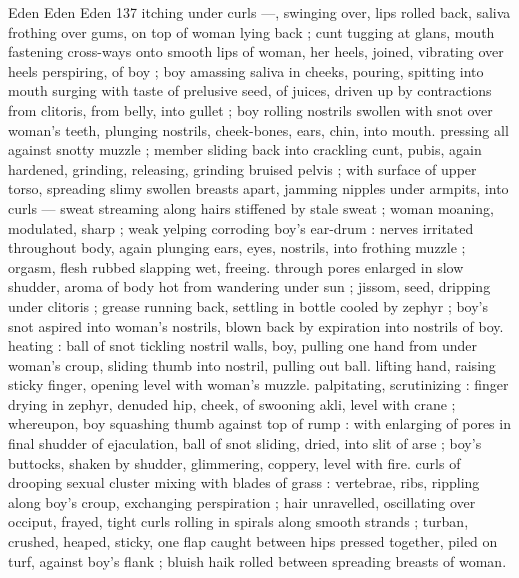 Eden Eden Eden 137
itching under curls —, swinging over, lips rolled back, saliva frothing
over gums, on top of woman lying back ; cunt tugging at glans,
mouth fastening cross-ways onto smooth lips of woman, her heels,
joined, vibrating over heels perspiring, of boy ; boy amassing saliva
in cheeks, pouring, spitting into mouth surging with taste of
prelusive seed, of juices, driven up by contractions from clitoris, from
belly, into gullet ; boy rolling nostrils swollen with snot over woman's
teeth, plunging nostrils, cheek-bones, ears, chin, into mouth.
pressing all against snotty muzzle ; member sliding back into
crackling cunt, pubis, again hardened, grinding, releasing, grinding
bruised pelvis ; with surface of upper torso, spreading slimy swollen
breasts apart, jamming nipples under armpits, into curls — sweat
streaming along hairs stiffened by stale sweat ; woman moaning,
modulated, sharp ; weak yelping corroding boy's ear-drum : nerves
irritated throughout body, again plunging ears, eyes, nostrils, into
frothing muzzle ; orgasm, flesh rubbed slapping wet, freeing.
through pores enlarged in slow shudder, aroma of body hot from
wandering under sun ; jissom, seed, dripping under clitoris ; grease
running back, settling in bottle cooled by zephyr ; boy's snot aspired
into woman's nostrils, blown back by expiration into nostrils of boy.
heating : ball of snot tickling nostril walls, boy, pulling one hand from
under woman's croup, sliding thumb into nostril, pulling out ball.
lifting hand, raising sticky finger, opening level with woman's muzzle.
palpitating, scrutinizing : finger drying in zephyr, denuded hip,
cheek, of swooning akli, level with crane ; whereupon, boy squashing
thumb against top of rump : with enlarging of pores in final shudder
of ejaculation, ball of snot sliding, dried, into slit of arse ; boy's
buttocks, shaken by shudder, glimmering, coppery, level with fire.
curls of drooping sexual cluster mixing with blades of grass :
vertebrae, ribs, rippling along boy's croup, exchanging perspiration
; hair unravelled, oscillating over occiput, frayed, tight curls rolling in
spirals along smooth strands ; turban, crushed, heaped, sticky, one
flap caught between hips pressed together, piled on turf, against
boy's flank ; bluish haik rolled between spreading breasts of woman.

